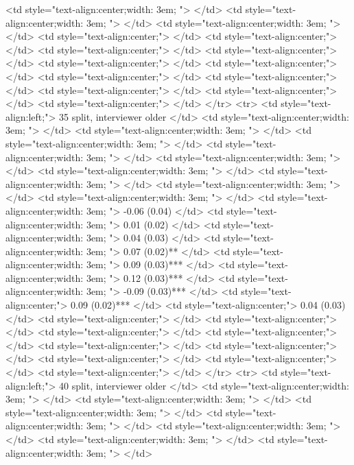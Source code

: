    <td style="text-align:center;width: 3em; ">  </td>
   <td style="text-align:center;width: 3em; ">  </td>
   <td style="text-align:center;width: 3em; ">  </td>
   <td style="text-align:center;">  </td>
   <td style="text-align:center;">  </td>
   <td style="text-align:center;">  </td>
   <td style="text-align:center;">  </td>
   <td style="text-align:center;">  </td>
   <td style="text-align:center;">  </td>
   <td style="text-align:center;">  </td>
   <td style="text-align:center;">  </td>
   <td style="text-align:center;">  </td>
   <td style="text-align:center;">  </td>
   <td style="text-align:center;">  </td>
  </tr>
  <tr>
   <td style="text-align:left;"> 35 split, interviewer older </td>
   <td style="text-align:center;width: 3em; ">  </td>
   <td style="text-align:center;width: 3em; ">  </td>
   <td style="text-align:center;width: 3em; ">  </td>
   <td style="text-align:center;width: 3em; ">  </td>
   <td style="text-align:center;width: 3em; ">  </td>
   <td style="text-align:center;width: 3em; ">  </td>
   <td style="text-align:center;width: 3em; ">  </td>
   <td style="text-align:center;width: 3em; ">  </td>
   <td style="text-align:center;width: 3em; ">  </td>
   <td style="text-align:center;width: 3em; "> -0.06 (0.04) </td>
   <td style="text-align:center;width: 3em; "> 0.01 (0.02) </td>
   <td style="text-align:center;width: 3em; "> 0.04 (0.03) </td>
   <td style="text-align:center;width: 3em; "> 0.07 (0.02)** </td>
   <td style="text-align:center;width: 3em; "> 0.09 (0.03)*** </td>
   <td style="text-align:center;width: 3em; "> 0.12 (0.03)*** </td>
   <td style="text-align:center;width: 3em; "> -0.09 (0.03)*** </td>
   <td style="text-align:center;"> 0.09 (0.02)*** </td>
   <td style="text-align:center;"> 0.04 (0.03) </td>
   <td style="text-align:center;">  </td>
   <td style="text-align:center;">  </td>
   <td style="text-align:center;">  </td>
   <td style="text-align:center;">  </td>
   <td style="text-align:center;">  </td>
   <td style="text-align:center;">  </td>
   <td style="text-align:center;">  </td>
   <td style="text-align:center;">  </td>
   <td style="text-align:center;">  </td>
  </tr>
  <tr>
   <td style="text-align:left;"> 40 split, interviewer older </td>
   <td style="text-align:center;width: 3em; ">  </td>
   <td style="text-align:center;width: 3em; ">  </td>
   <td style="text-align:center;width: 3em; ">  </td>
   <td style="text-align:center;width: 3em; ">  </td>
   <td style="text-align:center;width: 3em; ">  </td>
   <td style="text-align:center;width: 3em; ">  </td>
   <td style="text-align:center;width: 3em; ">  </td>
